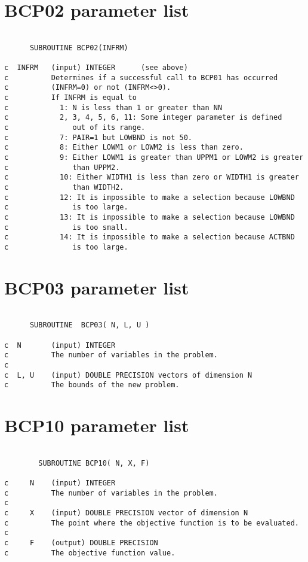 \section{BCP02 parameter list}
\begin{verbatim}

      SUBROUTINE BCP02(INFRM)

c  INFRM   (input) INTEGER      (see above)
c          Determines if a successful call to BCP01 has occurred 
c          (INFRM=0) or not (INFRM<>0).
c          If INFRM is equal to
c            1: N is less than 1 or greater than NN 
c            2, 3, 4, 5, 6, 11: Some integer parameter is defined
c               out of its range.
c            7: PAIR=1 but LOWBND is not 50.
c            8: Either LOWM1 or LOWM2 is less than zero.
c            9: Either LOWM1 is greater than UPPM1 or LOWM2 is greater 
c               than UPPM2.
c            10: Either WIDTH1 is less than zero or WIDTH1 is greater 
c               than WIDTH2.
c            12: It is impossible to make a selection because LOWBND
c               is too large.
c            13: It is impossible to make a selection because LOWBND
c               is too small.
c            14: It is impossible to make a selection because ACTBND
c               is too large.
\end{verbatim}

\section{BCP03 parameter list}
\begin{verbatim}
  
      SUBROUTINE  BCP03( N, L, U )

c  N       (input) INTEGER                 
c          The number of variables in the problem.
c
c  L, U    (input) DOUBLE PRECISION vectors of dimension N   
c          The bounds of the new problem. 
\end{verbatim}

\section{BCP10 parameter list}
\begin{verbatim}

        SUBROUTINE BCP10( N, X, F)

c     N    (input) INTEGER
c          The number of variables in the problem.
c
c     X    (input) DOUBLE PRECISION vector of dimension N
c          The point where the objective function is to be evaluated.
c
c     F    (output) DOUBLE PRECISION
c          The objective function value.
\end{verbatim}

